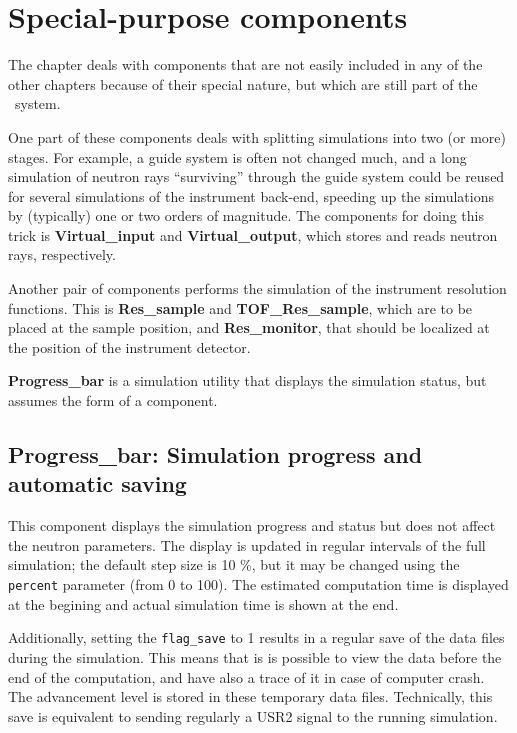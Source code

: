 \chapter{Special-purpose components}

The chapter deals with components that are not easily included
in any of the other chapters because of their special nature,
but which are still part of the \MCS\ system.

One part of these components deals with splitting simulations
into two (or more) stages. For example, a guide system is often
not changed much, and a long simulation of neutron rays
``surviving'' through the guide system could be reused
for several simulations of the instrument back-end, speeding up
the simulations by (typically) one or two orders of magnitude.
The components for doing this trick is {\bf Virtual\_input} and
{\bf Virtual\_output}, which stores and reads neutron rays, respectively.

Another pair of components performs the simulation of the instrument
resolution functions. This is {\bf Res\_sample} and {\bf TOF\_Res\_sample}, 
which are to be
placed at the sample position, and {\bf Res\_monitor}, that should
be localized at the position of the instrument detector.

{\bf Progress\_bar} is a simulation utility that displays the simulation
status, but assumes the form of a component.

\newpage


\newpage


\newpage


\newpage


\newpage


\newpage
\section{Progress\_bar: Simulation progress and automatic saving}
\label{s:progress-bar}

This component displays the simulation progress and status
but does not affect the neutron parameters. 
The display is updated in regular intervals of the full simulation;
the default step size is 10 \%, but it may be changed using 
the \verb+percent+ parameter (from 0 to 100). 
The estimated computation time is displayed at the begining 
and actual simulation time is shown at the end.

Additionally, setting the \verb+flag_save+ to 1 results in 
a regular save of the data files during the simulation. 
This means that is is possible to view the data before the end 
of the computation, and have also a trace of it in case of 
computer crash. The advancement level is stored in these temporary 
data files. Technically, this save is equivalent to sending regularly 
a USR2 signal to the running simulation.
